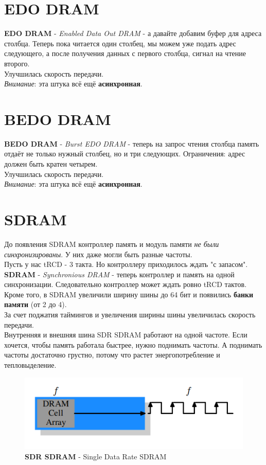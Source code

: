 \documentclass[12pt, a4paper]{article}
\begin{document}
\section{EDO DRAM}
\textbf{EDO DRAM} - \textit{Enabled Data Out DRAM} - а давайте добавим буфер для адреса столбца. Теперь пока читается один столбец, мы можем уже подать адрес следующего, а после получения данных с первого столбца, сигнал на чтение второго.\\
Улучшилась скорость передачи.\\
\textit{Внимание}: эта штука всё ещё \textbf{асинхронная}.
\section{BEDO DRAM}
\textbf{BEDO DRAM} - \textit{Burst EDO DRAM} - теперь на запрос чтения столбца память отдаёт не только нужный столбец, но и три следующих. Ограничения: адрес должен быть кратен четырем.\\
Улучшилась скорость передачи.\\
\textit{Внимание}: эта штука всё ещё \textbf{асинхронная}.
\section{SDRAM}
До появления SDRAM контроллер память и модуль памяти \textit{не были синхронизированы}. У них даже могли быть разные частоты.\\
Пусть у нас tRCD - 3 такта. Но контроллеру приходилось ждать "с запасом".\\
\textbf{SDRAM} - \textit{Synchronious DRAM} - теперь контроллер и память на одной синхронизации. Следовательно контроллер может ждать ровно tRCD тактов.\\
Кроме того, в SDRAM увеличили ширину шины до 64 бит и появились \textbf{банки памяти} (от 2 до 4).\\
За счет поджатия таймингов и увеличения ширины шины увеличилась скорость передачи.\\
Внутренняя и внешняя шина SDR SDRAM работают на одной частоте. Если хочется, чтобы память работала быстрее, нужно поднимать частоты. А поднимать частоты достаточно грустно, потому что растет энергопотребление и тепловыделение.
\begin{figure}[h]
    \centering
    \includegraphics[scale=0.6]{./images/SDR_SDRAM.png}
    \caption{\textbf{SDR SDRAM} - Single Data Rate SDRAM}
    \label{fig:SDR_SDRAM}
\end{figure}
\end{document}
